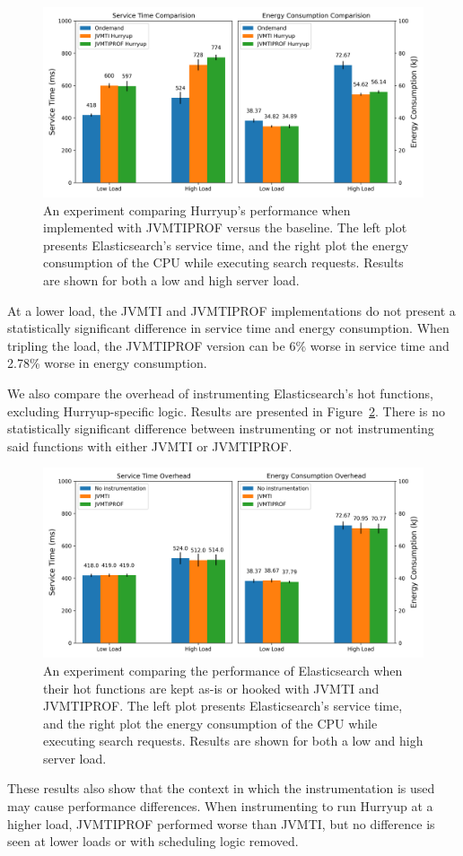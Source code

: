 \begin{figure}[ht]
\centering
\includegraphics[width=1.0\textwidth]{src/figure/ondem_vs_hup_vs_newhup.png}
\caption{An experiment comparing Hurryup's performance when implemented with JVMTIPROF versus the baseline. The left plot presents Elasticsearch's service time, and the right plot the energy consumption of the CPU while executing search requests. Results are shown for both a low and high server load.}
\label{fig:ondem_vs_hup_vs_newhup}
\end{figure}

At a lower load, the JVMTI and JVMTIPROF implementations do not present a statistically significant difference in service time and energy consumption. When tripling the load, the JVMTIPROF version can be 6\% worse in service time and 2.78\% worse in energy consumption.

We also compare the overhead of instrumenting Elasticsearch's hot functions, excluding Hurryup-specific logic. Results are presented in Figure~\ref{fig:overhead}. There is no statistically significant difference between instrumenting or not instrumenting said functions with either JVMTI or JVMTIPROF.

\begin{figure}[ht]
\centering
\includegraphics[width=1.0\textwidth]{src/figure/overhead.png}
\caption{An experiment comparing the performance of Elasticsearch when their hot functions are kept as-is or hooked with JVMTI and JVMTIPROF. The left plot presents Elasticsearch's service time, and the right plot the energy consumption of the CPU while executing search requests. Results are shown for both a low and high server load.}
\label{fig:overhead}
\end{figure}

These results also show that the context in which the instrumentation is used may cause performance differences. When instrumenting to run Hurryup at a higher load, JVMTIPROF performed worse than JVMTI, but no difference is seen at lower loads or with scheduling logic removed.
